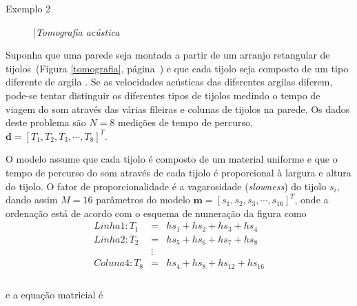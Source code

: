 \documentclass[a4paper, 12 pt]{article} %
\begin{document}
\begin{description}
	\item[Exemplo 2] |\textit{Tomografia acústica} 
\end{description}

Suponha que uma parede seja montada a partir de um arranjo retangular de tijolos~(Figura \ref{tomografia}, página~\pageref{tomografia}) e que cada tijolo seja composto de um tipo diferente de argila \citep{menke1984geophysical}. Se as velocidades acústicas das diferentes argilas diferem, pode-se tentar distinguir os diferentes tipos de tijolos medindo o tempo de viagem do som através das várias fileiras e colunas de tijolos na parede. Os dados deste problema são $N = 8$ medições de tempo de percurso, $\textbf{d} = [T_{1}, T_{2}, T_{3}, \cdots, T_{8}]^T$. 

O modelo assume que cada tijolo é composto de um material uniforme e que o tempo de percurso do som através de cada tijolo é proporcional à largura e altura do tijolo. O fator de proporcionalidade é a vagarosidade (\textit{slowness}) do tijolo $s_{i}$, dando assim $M = 16$ parâmetros do modelo $\textbf{m} = [s_{1}, s_{2}, s_{3}, \cdots, s_{16}]^T$, onde a ordenação está de acordo com o esquema de numeração da figura como \\


\begin{equation}\label{eq:formulation_tomografia}
\begin{matrix}
Linha 1: T_{1} &=& hs_{1} + hs_{2} + hs_{3} + hs_{4} \\
Linha 2: T_{2} &=& hs_{5} + hs_{6} + hs_{7} + hs_{8} \\
&\vdots \\
Coluna 4: T_{8} &=& hs_{4} + hs_{8} + hs_{12} + hs_{16} \\
\end{matrix}
\end{equation} \\
e a equação matricial é \\
\end{document}
